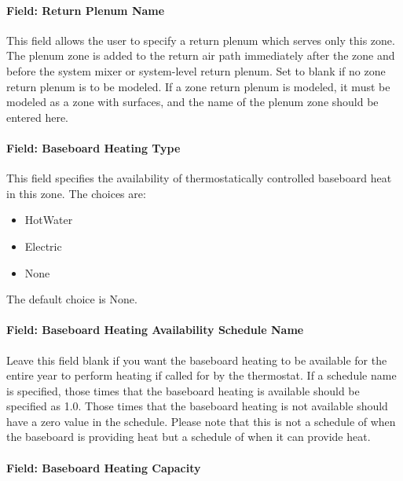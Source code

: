 \paragraph{Field: Return Plenum Name}\label{field-return-plenum-name}

This field allows the user to specify a return plenum which serves only this zone. The plenum zone is added to the return air path immediately after the zone and before the system mixer or system-level return plenum. Set to blank if no zone return plenum is to be modeled. If a zone return plenum is modeled, it must be modeled as a zone with surfaces, and the name of the plenum zone should be entered here.

\paragraph{Field: Baseboard Heating Type}\label{field-baseboard-heating-type-6}

This field specifies the availability of thermostatically controlled baseboard heat in this zone. The choices are:

\begin{itemize}
\item
  HotWater
\item
  Electric
\item
  None
\end{itemize}

The default choice is None.

\paragraph{Field: Baseboard Heating Availability Schedule Name}\label{field-baseboard-heating-availability-schedule-name-6}

Leave this field blank if you want the baseboard heating to be available for the entire year to perform heating if called for by the thermostat. If a schedule name is specified, those times that the baseboard heating is available should be specified as 1.0. Those times that the baseboard heating is not available should have a zero value in the schedule. Please note that this is not a schedule of when the baseboard is providing heat but a schedule of when it can provide heat.

\paragraph{Field: Baseboard Heating Capacity}\label{field-baseboard-heating-capacity-6}

